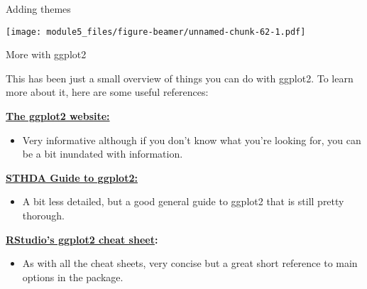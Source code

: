\documentclass[ignorenonframetext,]{beamer}
\providecommand{\tightlist}{%
  \setlength{\itemsep}{0pt}\setlength{\parskip}{0pt}}
\begin{document}
\begin{frame}{Adding themes}

\texttt{[image: module5\_files/figure-beamer/unnamed-chunk-62-1.pdf]}

\end{frame}

\begin{frame}{More with ggplot2}

This has been just a small overview of things you can do with ggplot2.
To learn more about it, here are some useful references:

\href{http://ggplot2.tidyverse.org/}{\textbf{The ggplot2 website:}}

\begin{itemize}
\tightlist
\item
  Very informative although if you don't know what you're looking for,
  you can be a bit inundated with information.
\end{itemize}

\href{http://www.sthda.com/english/wiki/ggplot2-essentials}{\textbf{STHDA
Guide to ggplot2:}}

\begin{itemize}
\tightlist
\item
  A bit less detailed, but a good general guide to ggplot2 that is still
  pretty thorough.
\end{itemize}

\textbf{\href{https://github.com/rstudio/cheatsheets/raw/master/data-visualization-2.1.pdf}{RStudio's
ggplot2 cheat sheet}:}

\begin{itemize}
\tightlist
\item
  As with all the cheat sheets, very concise but a great short reference
  to main options in the package.
\end{itemize}

\end{frame}
\end{document}
